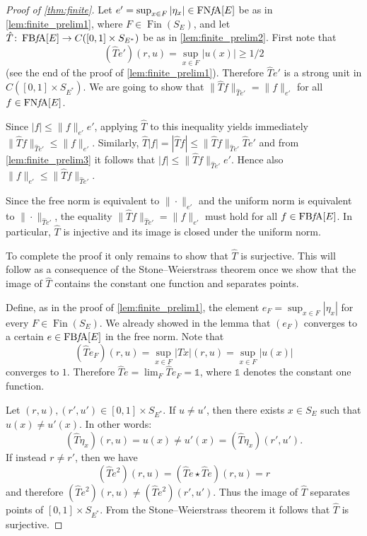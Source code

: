 \documentclass{memo-l}
\theoremstyle{definition}
\theoremstyle{remark}
\numberwithin{section}{chapter}
\numberwithin{equation}{chapter}
\newcommand{\one}{\ensuremath{\mathbb{1}}}
\newcommand{\FNFA}[1]{\operatorname{FN{\it f}\!A}[#1]}
\newcommand{\FBFA}[1]{\operatorname{FB{\it f}\!A}[#1]}
\DeclareMathOperator{\Fin}{Fin}
\begin{document}
\begin{proof}[Proof of \cref{thm:finite}]
    Let $e' =\sup_{x \in F}|\eta _x|\in \FNFA E$ be as in \cref{lem:finite_prelim1}, where
    $F \in \Fin(S_E)$, and let
    $\hat{T}\colon \FBFA E\to C([0,1]\times S_{E^{*}})$ be as in
    \cref{lem:finite_prelim2}. First note that
    \[
    (\hat{T}e')(r,u)=\sup_{x \in F} |u(x)|\ge 1/2
    \]
    (see the end of the proof of \cref{lem:finite_prelim1}).
    Therefore $\hat{T}e'$ is a strong unit in $C([0,1]\times
    S_{E^{*}})$. We are going to show that
    $\|\hat{T}f\|_{\hat{T}e'}=\|f\|_{e'}$ for all $f \in \FNFA E$.

    Since $|f|\le \|f\|_{e'}e'$, applying $\hat{T}$ to this inequality
    yields immediately $\|\hat{T}f\|_{\hat{T}e'}\le \|f\|_{e'}$.
    Similarly, $\hat{T}|f|=|\hat{T}f|\le
    \|\hat{T}f\|_{\hat{T}e'}\hat{T}e'$ and from
    \cref{lem:finite_prelim3} it follows that $|f|\le
    \|\hat{T}f\|_{\hat{T}e'}e'$. Hence also $\|f\|_{e'}\le
    \|\hat{T}f\|_{\hat{T}e'}$.

    Since the free norm is equivalent to $\|{\cdot }\|_{e'}$ and the
    uniform norm is equivalent to $\|{\cdot }\|_{\hat{T}e'}$, the
    equality $\|\hat{T}f\|_{\hat{T}e'}=\|f\|_{e'}$ must hold for all
    $f \in \FBFA E$. In particular, $\hat{T}$ is injective and its
    image is closed under the uniform norm.

    To complete the proof it only remains to show that $\hat{T}$ is
    surjective. This will follow as a consequence of the Stone--Weierstrass
    theorem once we show that the image of $\hat{T}$ contains the
    constant one function and separates points.

    Define, as in the proof of \cref{lem:finite_prelim1}, the element $e_F=\sup_{x \in F}|\eta _x|$ for every $F
    \in \Fin(S_E)$. We
    already showed in the lemma that $(e_F)$ converges to a certain $e \in \FBFA E$ in
    the free norm. Note that
    \[
        (\hat{T}e_F)(r,u)=\sup_{x \in F}|Tx|(r,u)=\sup_{x \in
        F}|u(x)|
    \]
    converges to $1$. Therefore
    $\hat{T}e=\lim_{F}\hat{T}e_F=\one$, where $\one$ denotes the
    constant one function.

    Let $(r,u), (r',u') \in [0,1]\times S_{E^{*}}$. If $u\neq u'$,
    then there exists $x \in S_E$ such that $u(x)\neq u'(x)$. In other
    words:
    \[
        (\hat{T}\eta _x)(r,u)=u(x)\neq u'(x)=(\hat{T}\eta _x)(r',u').
    \]
    If instead $r\neq r'$, then we have
    \[
        (\hat{T}e^2)(r,u)=(\hat{T}e\star \hat{T}e)(r,u)=r
    \]
    and therefore $(\hat{T}e^2)(r,u)\neq (\hat{T}e^2)(r',u')$. Thus
    the image of $\hat{T}$ separates points of $[0,1]\times S_{E^{*}}$. From the Stone--Weierstrass
    theorem it follows that $\hat{T}$ is surjective.
\end{proof}
\end{document}
